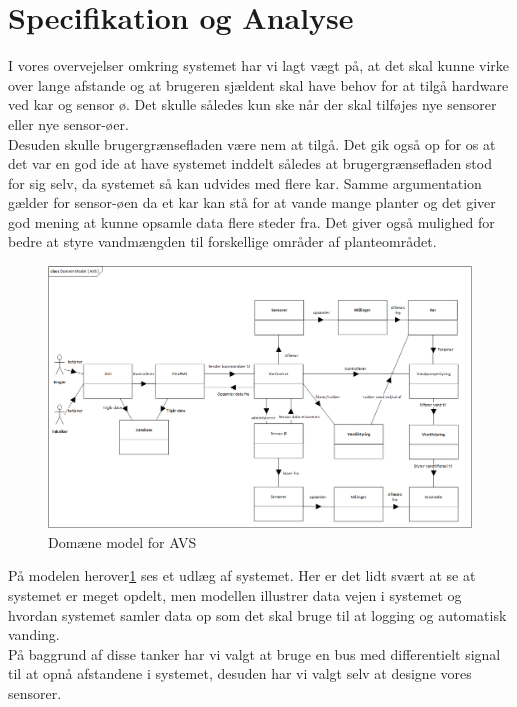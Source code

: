 \section{Specifikation og Analyse}
I vores overvejelser omkring systemet har vi lagt vægt på, at det skal kunne virke over lange afstande og at brugeren sjældent skal have behov for at tilgå hardware ved kar og sensor ø. Det skulle således kun ske når der skal tilføjes nye sensorer eller nye sensor-øer. \\
Desuden skulle brugergrænsefladen være nem at tilgå. Det gik også op for os at det var en god ide at have systemet inddelt således at brugergrænsefladen stod for sig selv, da systemet så kan udvides med flere kar. Samme argumentation gælder for sensor-øen da et kar kan stå for at vande mange planter og det giver god mening at kunne opsamle data flere steder fra. Det giver også mulighed for bedre at styre vandmængden til forskellige områder af planteområdet.

\begin{figure}[H]
	\centering
	\includegraphics[width=1\textwidth]{Projektbeskrivelse/SpecifikationOgAnalyse/System_Domain_Model.png}
	\caption{Domæne model for AVS}
	\label{fig:DomaeneSys}
\end{figure} 

På modelen herover\ref{fig:DomaeneSys} ses et udlæg af systemet. Her er det lidt svært at se at systemet er meget opdelt, men modellen illustrer data vejen i systemet og hvordan systemet samler data op som det skal bruge til at logging og automatisk vanding.
\\
På baggrund af disse tanker har vi valgt at bruge en bus med differentielt signal til at opnå afstandene i systemet, desuden har vi valgt selv at designe vores sensorer.